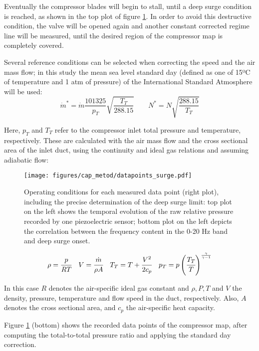 Eventually the compressor blades will begin to stall, until a deep surge condition is reached, as shown in the top plot of figure \ref{fig:surge_datapoints}. In order to avoid this destructive condition, the valve will be opened again and another constant corrected regime line will be measured, until the desired region of the compressor map is completely covered.

Several reference conditions can be selected when correcting the speed and the air mass flow; in this study the mean sea level standard day (defined as one of 15ºC of temperature and 1 atm of pressure) of the International Standard Atmosphere will be used:
\begin{equation}
    \dot m^* = \dot m\frac{101325}{p_{T}}\sqrt{\frac{T_{T}}{288.15}}
    \qquad N^*=N\sqrt{\frac{288.15}{T_{T}}}
\end{equation}

Here, $p_{T}$ and $T_{T}$ refer to the compressor inlet total pressure and temperature, respectively. These are calculated with the air mass flow and the cross sectional area of the inlet duct, using the continuity and ideal gas relations and assuming adiabatic flow:

\begin{figure}[bth!]
\centering
\texttt{[image: figures/cap\_metod/datapoints\_surge.pdf]}
\caption{Operating conditions for each measured data point (right plot), including the precise determination of the deep surge limit: top plot on the left shows the temporal evolution of the raw relative pressure recorded by one piezoelectric sensor; bottom plot on the left depicts the correlation between the frequency content in the 0-20 Hz band and deep surge onset.}
\label{fig:surge_datapoints}
\end{figure}

\begin{equation}
    \rho =\cfrac{p}{RT} \quad
    V =\cfrac{\dot m}{\rho A} \quad
    T_{T}=T+\cfrac{V^2}{2c_p} \quad
    p_{T}=p\left(\cfrac{T_{T}}{T}\right)^\frac{\gamma}{\gamma-1}
\end{equation}

In this case $R$ denotes the air-specific ideal gas constant and $\rho,P,T$ and $V$ the density, pressure, temperature and flow speed in the duct, respectively. Also, $A$ denotes the cross sectional area, and $c_p$ the air-specific heat capacity.

Figure \ref{fig:surge_datapoints} (bottom) shows the recorded data points of the compressor map, after computing the total-to-total pressure ratio and
applying the standard day correction.

